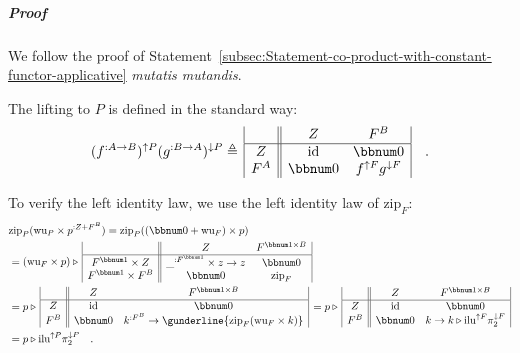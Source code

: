 \subparagraph{Proof}

We follow the proof of Statement~\ref{subsec:Statement-co-product-with-constant-functor-applicative}
\emph{mutatis mutandis}.

The lifting to $P$ is defined in the standard way:
\[
(f^{:A\rightarrow B})^{\uparrow P}(g^{:B\rightarrow A})^{\downarrow P}\triangleq\,\begin{array}{|c||cc|}
 & Z & F^{B}\\
\hline Z & \text{id} & \bbnum 0\\
F^{A} & \bbnum 0 & f^{\uparrow F}g^{\downarrow F}
\end{array}\quad.
\]

To verify the left identity law, we use the left identity law of $\text{zip}_{F}$:
\begin{align*}
 & \text{zip}_{P}(\text{wu}_{P}\times p^{:Z+F^{B}})=\text{zip}_{P}((\bbnum 0+\text{wu}_{F})\times p)\\
 & =(\text{wu}_{F}\times p)\triangleright\,\begin{array}{|c||cc|}
 & Z & F^{\bbnum 1\times B}\\
\hline F^{\bbnum 1}\times Z & \_^{:F^{\bbnum 1}}\times z\rightarrow z & \bbnum 0\\
F^{\bbnum 1}\times F^{B} & \bbnum 0 & \text{zip}_{F}
\end{array}\\
 & =p\triangleright\,\begin{array}{|c||cc|}
 & Z & F^{\bbnum 1\times B}\\
\hline Z & \text{id} & \bbnum 0\\
F^{B} & \bbnum 0 & k^{:F^{B}}\rightarrow\gunderline{\text{zip}_{F}(\text{wu}_{F}\times k)}
\end{array}\,=p\triangleright\,\begin{array}{|c||cc|}
 & Z & F^{\bbnum 1\times B}\\
\hline Z & \text{id} & \bbnum 0\\
F^{B} & \bbnum 0 & k\rightarrow k\triangleright\text{ilu}^{\uparrow F}\pi_{2}^{\downarrow F}
\end{array}\\
 & =p\triangleright\text{ilu}^{\uparrow P}\pi_{2}^{\downarrow P}\quad.
\end{align*}

